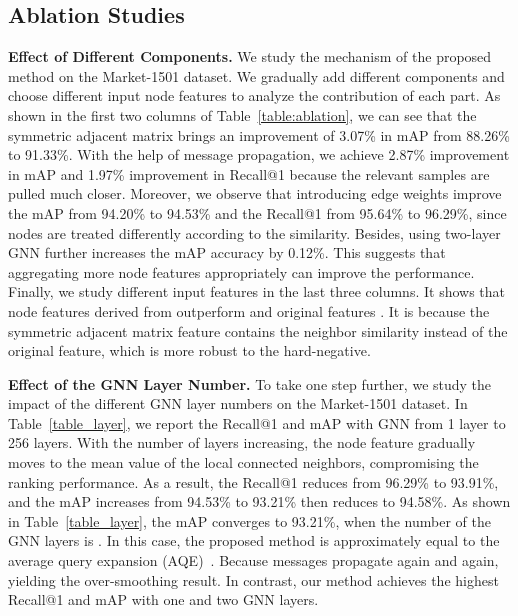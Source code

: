 \documentclass[10pt,twocolumn,letterpaper]{article}
\begin{document}
\subsection{Ablation Studies} \label{sec:ablation}
\noindent\textbf{Effect of Different Components.} We study the mechanism of the proposed method on the Market-1501 dataset. 
We gradually add different components and choose different input node features to analyze the contribution of each part. As shown in the first two columns of Table~\ref{table:ablation}, we can see that the symmetric adjacent matrix  brings an improvement of 3.07\% in mAP  from 88.26\% to 91.33\%. 
With the help of message propagation, we achieve 2.87\% improvement in mAP and 1.97\% improvement in Recall@1 because the relevant samples are pulled much closer. Moreover, we observe that introducing edge weights improve the mAP from 94.20\% to 94.53\% and the Recall@1 from 95.64\% to 96.29\%, since nodes are treated differently according to the similarity.
Besides, using two-layer GNN further increases the mAP accuracy by 0.12\%. This suggests that aggregating more node features appropriately can improve the performance. 
Finally, we study different input features in the last three columns. It shows that node features derived from  outperform   and original features . It is because the symmetric adjacent matrix feature contains the neighbor similarity instead of the original feature, which is more robust to the hard-negative.

\noindent\textbf{Effect of the GNN Layer Number.}\label{sec:layers} To take one step further, we study the impact of the different GNN layer numbers on the Market-1501 dataset. In Table~\ref{table_layer}, we report the Recall@1 and mAP with GNN from 1 layer to 256 layers.
With the number of layers increasing, the node feature gradually moves to the mean value of the local connected neighbors, compromising the ranking performance.
As a result, the Recall@1 reduces from 96.29\% to 93.91\%, and the mAP increases from 94.53\% to 93.21\% then reduces to 94.58\%. 
As shown in Table~\ref{table_layer}, the mAP converges to 93.21\%, when the number of the GNN layers is . In this case, the proposed method is approximately equal to the average query expansion (AQE)~\cite{chum2007total}.
Because messages propagate again and again, yielding the over-smoothing result. In contrast, our method achieves the highest Recall@1 and mAP with one and two GNN layers. 
\end{document}
